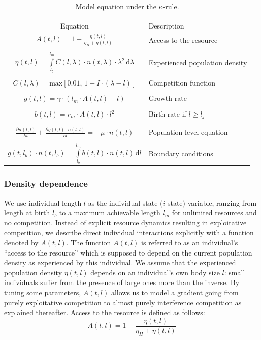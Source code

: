 \begin{table}
\centering
\caption{\label{tab:Eq} Model equation under the $\kappa$-rule.}
\begin{tabular}{cl}
\hline 
\hline
&\\
Equation & Description \\
\hline
	$\displaystyle{A(t,l)=1-\frac{\eta(t,l)}{\eta_{H}+\eta(t,l)}}$ & Access to the
	resource\\
	&\\
	$\displaystyle{\eta (t,l) = \int\limits_{l_b}^{l_m} C(l,\lambda)\cdot
	n(t,\lambda)\cdot \lambda^2\,\text{d}\lambda}$ & Experienced population
	density\\
	&\\
	$\displaystyle{C(l,\lambda) = \text{max}[0.01,\, 1+I\cdot(\lambda-l)]}$ &
	Competition function \\
	&\\
	$\displaystyle{g(t,l) = \gamma\cdot(l_m \cdot A(t,l)-l)}$ & Growth rate\\
	&\\
	$\displaystyle{b(t,l) = r_m \cdot A(t,l)\cdot l^2}$ & Birth rate if $l\geq
	l_j$\\
	&\\
	&\\
	$\displaystyle{\frac{\partial n(t,l)}{\partial t}+ \frac{\partial
	g(t,l)\cdot n(t,l)}{\partial l} = -\mu \cdot n(t,l) }$ & Population level
	equation\\
	&\\
	$\displaystyle{g(t,l_b)\cdot n(t,l_b) = \int\limits_{l_b}^{l_m} b(t,l)\cdot
	n(t,l) \, \text{d}l}$ & Boundary conditions \\
\hline 
\end{tabular} 
\end{table}

\subsubsection{Density dependence}

We use individual length $l$ as the individual state ($i$-state) variable,
ranging from length at birth $l_b$ to a maximum achievable length $l_m$ for
unlimited resources and no competition. Instead of explicit resource dynamics
resulting in exploitative competition, we describe direct individual
interactions explicitly with a function denoted by $A(t,l)$. The function
$A(t,l)$ is referred to as an individual's “access to the resource” which is
supposed to depend on the current population density as experienced by this
individual. We assume that the experienced population density $\eta(t,l)$
depends on an individual's own body size $l$: small individuals suffer from the
presence of large ones more than the inverse. By tuning some parameters,
$A(t,l)$ allows us to model a gradient going from purely exploitative
competition to almost purely interference competition as explained thereafter.
Access to the resource is defined as follows:
\begin{equation}
\label{eq_1}
A(t,l)=1-\frac{\eta(t,l)}{\eta_H+\eta(t,l) }  
\end{equation}

